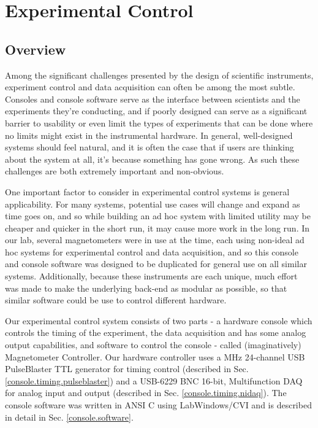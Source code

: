 \documentclass[PaulGanssle-Thesis.tex]{subfiles}
\begin{document}
\chapter{Experimental Control}
\label{Chapter:Console}
\section{Overview}
\label{console.overview}
Among the significant challenges presented by the design of scientific instruments, experiment control and data acquisition can often be among the most subtle. Consoles and console software serve as the interface between scientists and the experiments they're conducting, and if poorly designed can serve as a significant barrier to usability or even limit the types of experiments that can be done where no limits might exist in the instrumental hardware. In general, well-designed systems should feel natural, and it is often the case that if users are thinking about the system at all, it's because something has gone wrong. As such these challenges are both extremely important and non-obvious.

One important factor to consider in experimental control systems is general applicability. For many systems, potential use cases will change and expand as time goes on, and so while building an ad hoc system with limited utility may be cheaper and quicker in the short run, it may cause more work in the long run. In our lab, several magnetometers were in use at the time, each using non-ideal ad hoc systems for experimental control and data acquisition, and so this console and console software was designed to be duplicated for general use on all similar systems. Additionally, because these instruments are each unique, much effort was made to make the underlying back-end as modular as possible, so that similar software could be use to control different hardware.

Our experimental control system consists of two parts - a hardware console which controls the timing of the experiment, the data acquisition and has some analog output capabilities, and software to control the console - called (imaginatively) Magnetometer Controller. Our hardware controller uses a \unit[100]{MHz} 24-channel USB PulseBlaster TTL generator for timing control (described in Sec. \ref{console.timing.pulseblaster}) and a USB-6229 BNC 16-bit,  Multifunction DAQ for analog input and output (described in Sec. \ref{console.timing.nidaq}). The console software was written in ANSI C using LabWindows/CVI and is described in detail in Sec. \ref{console.software}.
\end{document}
